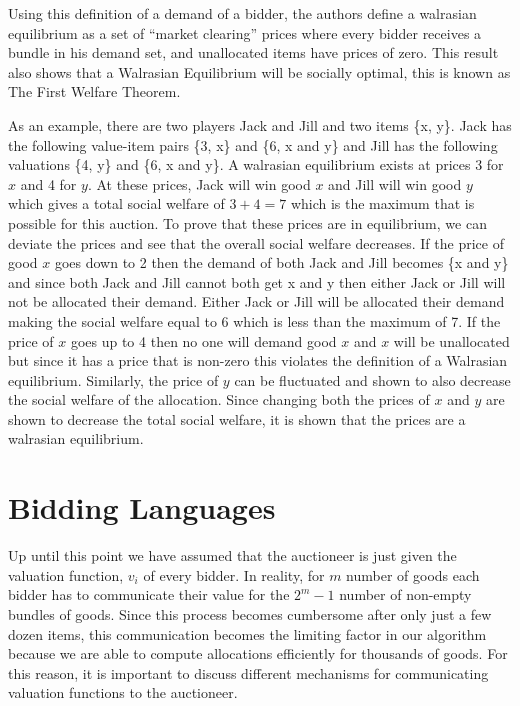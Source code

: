 \documentclass[10pt,onecolumn,letterpaper]{article}
\theoremstyle{definition}
\begin{document}
Using this definition of a demand of a bidder, the authors define a walrasian equilibrium as a set of ``market clearing'' prices where every bidder receives a bundle in his demand set, and unallocated items have prices of zero. This result also shows that a Walrasian Equilibrium will be socially optimal, this is known as The First Welfare Theorem. 

As an example, there are two players Jack and Jill and two items \{x, y\}. Jack has the following value-item pairs \{3, x\} and \{6, x and y\} and Jill has the following valuations \{4, y\} and \{6, x and y\}. A walrasian equilibrium exists at prices 3 for $x$ and 4 for $y$. At these prices, Jack will win good $x$ and Jill will win good $y$ which gives a total social welfare of $3 + 4 = 7$ which is the maximum that is possible for this auction. To prove that these prices are in equilibrium, we can deviate the prices and see that the overall social welfare decreases. If the price of good $x$ goes down to 2 then the demand of both Jack and Jill becomes \{x and y\} and since both Jack and Jill cannot both get x and y then either Jack or Jill will not be allocated their demand. Either Jack or Jill will be allocated their demand making the social welfare equal to 6 which is less than the maximum of 7. If the price of $x$ goes up to 4 then no one will demand good $x$ and $x$ will be unallocated but since it has a price that is non-zero this violates the definition of a Walrasian equilibrium. Similarly, the price of $y$ can be fluctuated and shown to also decrease the social welfare of the allocation. Since changing both the prices of $x$ and $y$ are shown to decrease the total social welfare, it is shown that the prices are a walrasian equilibrium.

\section{Bidding Languages} %

Up until this point we have assumed that the auctioneer is just given the valuation function, $v_i$ of every bidder. In reality, for $m$ number of goods each bidder has to communicate their value for the $2^m - 1$ number of non-empty bundles of goods. Since this process becomes cumbersome after only just a few dozen items, this communication becomes the limiting factor in our algorithm because we are able to compute allocations efficiently for thousands of goods. For this reason, it is important to discuss different mechanisms for communicating valuation functions to the auctioneer. 
\end{document}

